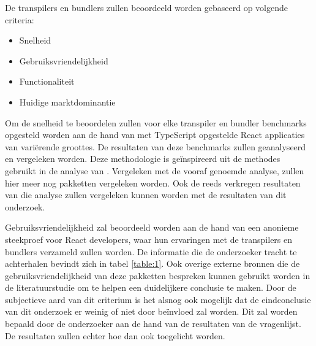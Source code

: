 De transpilers en bundlers zullen beoordeeld worden gebaseerd op volgende criteria:

\begin{itemize}
  \item Snelheid
  \item Gebruiksvriendelijkheid
  \item Functionaliteit
  \item Huidige marktdominantie
\end{itemize}

Om de snelheid te beoordelen zullen voor elke transpiler en bundler benchmarks opgesteld worden aan de hand van met TypeScript opgestelde React applicaties van variërende groottes. De resultaten van deze benchmarks zullen geanalyseerd en vergeleken worden. Deze methodologie is geïnspireerd uit de methodes gebruikt in de analyse van \textcite{eaton_2021}. Vergeleken met de vooraf genoemde analyse, zullen hier meer nog pakketten vergeleken worden. Ook de reeds verkregen resultaten van die analyse zullen vergeleken kunnen worden met de resultaten van dit onderzoek.

Gebruiksvriendelijkheid zal beoordeeld worden aan de hand van een anonieme steekproef voor React developers, waar hun ervaringen met de transpilers en bundlers verzameld zullen worden.
De informatie die de onderzoeker tracht te achterhalen bevindt zich in tabel \ref{table:1}.
Ook overige externe bronnen die de gebruiksvriendelijkheid van deze pakketten bespreken kunnen gebruikt worden in de literatuurstudie om te helpen een duidelijkere conclusie te maken. Door de subjectieve aard van dit criterium is het alsnog ook mogelijk dat de eindconclusie van dit onderzoek er weinig of niet door beïnvloed zal worden. Dit zal worden bepaald door de onderzoeker aan de hand van de resultaten van de vragenlijst. De resultaten zullen echter hoe dan ook toegelicht worden.

